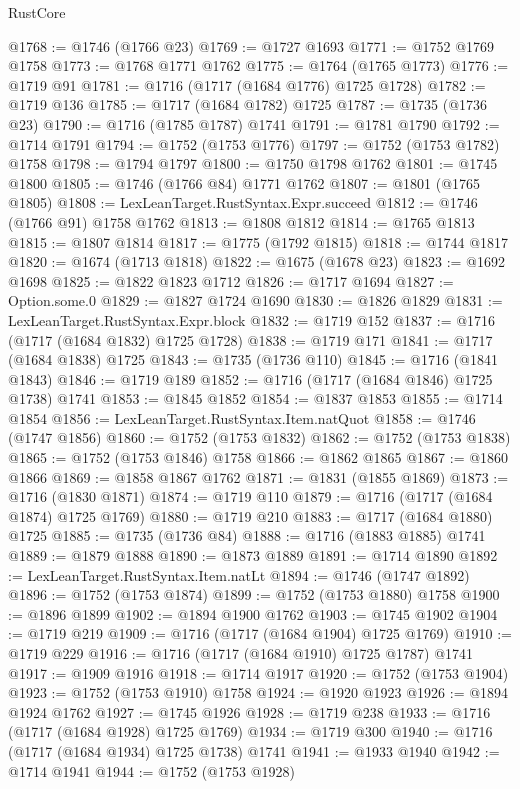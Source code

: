 \begin{lexlean}{RustCore}
\begin{coremodule}
@1768 := @1746 (@1766 @23)
@1769 := @1727 @1693
@1771 := @1752 @1769 @1758
@1773 := @1768 @1771 @1762
@1775 := @1764 (@1765 @1773)
@1776 := @1719 @91
@1781 := @1716 (@1717 (@1684 @1776) @1725 @1728)
@1782 := @1719 @136
@1785 := @1717 (@1684 @1782) @1725
@1787 := @1735 (@1736 @23)
@1790 := @1716 (@1785 @1787) @1741
@1791 := @1781 @1790
@1792 := @1714 @1791
@1794 := @1752 (@1753 @1776)
@1797 := @1752 (@1753 @1782) @1758
@1798 := @1794 @1797
@1800 := @1750 @1798 @1762
@1801 := @1745 @1800
@1805 := @1746 (@1766 @84) @1771 @1762
@1807 := @1801 (@1765 @1805)
@1808 := LexLeanTarget.RustSyntax.Expr.succeed
@1812 := @1746 (@1766 @91) @1758 @1762
@1813 := @1808 @1812
@1814 := @1765 @1813
@1815 := @1807 @1814
@1817 := @1775 (@1792 @1815)
@1818 := @1744 @1817
@1820 := @1674 (@1713 @1818)
@1822 := @1675 (@1678 @23)
@1823 := @1692 @1698
@1825 := @1822 @1823 @1712
@1826 := @1717 @1694
@1827 := Option.some.{0}
@1829 := @1827 @1724 @1690
@1830 := @1826 @1829
@1831 := LexLeanTarget.RustSyntax.Expr.block
@1832 := @1719 @152
@1837 := @1716 (@1717 (@1684 @1832) @1725 @1728)
@1838 := @1719 @171
@1841 := @1717 (@1684 @1838) @1725
@1843 := @1735 (@1736 @110)
@1845 := @1716 (@1841 @1843)
@1846 := @1719 @189
@1852 := @1716 (@1717 (@1684 @1846) @1725 @1738) @1741
@1853 := @1845 @1852
@1854 := @1837 @1853
@1855 := @1714 @1854
@1856 := LexLeanTarget.RustSyntax.Item.natQuot
@1858 := @1746 (@1747 @1856)
@1860 := @1752 (@1753 @1832)
@1862 := @1752 (@1753 @1838)
@1865 := @1752 (@1753 @1846) @1758
@1866 := @1862 @1865
@1867 := @1860 @1866
@1869 := @1858 @1867 @1762
@1871 := @1831 (@1855 @1869)
@1873 := @1716 (@1830 @1871)
@1874 := @1719 @110
@1879 := @1716 (@1717 (@1684 @1874) @1725 @1769)
@1880 := @1719 @210
@1883 := @1717 (@1684 @1880) @1725
@1885 := @1735 (@1736 @84)
@1888 := @1716 (@1883 @1885) @1741
@1889 := @1879 @1888
@1890 := @1873 @1889
@1891 := @1714 @1890
@1892 := LexLeanTarget.RustSyntax.Item.natLt
@1894 := @1746 (@1747 @1892)
@1896 := @1752 (@1753 @1874)
@1899 := @1752 (@1753 @1880) @1758
@1900 := @1896 @1899
@1902 := @1894 @1900 @1762
@1903 := @1745 @1902
@1904 := @1719 @219
@1909 := @1716 (@1717 (@1684 @1904) @1725 @1769)
@1910 := @1719 @229
@1916 := @1716 (@1717 (@1684 @1910) @1725 @1787) @1741
@1917 := @1909 @1916
@1918 := @1714 @1917
@1920 := @1752 (@1753 @1904)
@1923 := @1752 (@1753 @1910) @1758
@1924 := @1920 @1923
@1926 := @1894 @1924 @1762
@1927 := @1745 @1926
@1928 := @1719 @238
@1933 := @1716 (@1717 (@1684 @1928) @1725 @1769)
@1934 := @1719 @300
@1940 := @1716 (@1717 (@1684 @1934) @1725 @1738) @1741
@1941 := @1933 @1940
@1942 := @1714 @1941
@1944 := @1752 (@1753 @1928)

\end{coremodule}
\end{lexlean}
